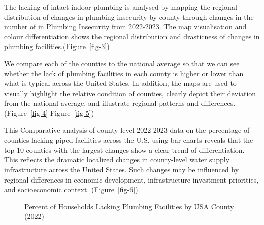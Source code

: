\documentclass[
  letterpaper,
  DIV=11,
  numbers=noendperiod]{scrartcl}
\begin{document}
The lacking of intact indoor plumbing is analysed by mapping the
regional distribution of changes in plumbing insecurity by county
through changes in the number of in Plumbing Insecurity from 2022-2023.
The map visualisation and colour differentiation shows the regional
distribution and drasticness of changes in plumbing
facilities.(Figure~\ref{fig-3})

We compare each of the counties to the national average so that we can
see whether the lack of plumbing facilities in each county is higher or
lower than what is typical across the United States. In addition, the
maps are used to visually highlight the relative condition of counties,
clearly depict their deviation from the national average, and illustrate
regional patterns and differences.(Figure~\ref{fig-4}
Figure~\ref{fig-5})

This Comparative analysis of county-level 2022-2023 data on the
percentage of counties lacking piped facilities across the U.S. using
bar charts reveals that the top 10 counties with the largest changes
show a clear trend of differentiation. This reflects the dramatic
localized changes in county-level water supply infrastructure across the
United States. Such changes may be influenced by regional differences in
economic development, infrastructure investment priorities, and
socioeconomic context. (Figure~\ref{fig-6})

\begin{figure}[H]


\caption{\label{fig-1}Percent of Households Lacking Plumbing Facilities
by USA County (2022)}

\end{figure}%
\end{document}
